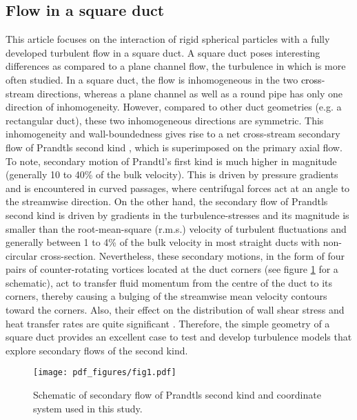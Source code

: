 \documentclass{jfm}
\def\sz#1{{\textcolor{black}{#1}}}
\begin{document}
\subsection{Flow in a square duct}\label{sec:Flow in a square duct}
This article focuses on the interaction of rigid spherical particles with a fully developed turbulent flow in a square duct. A square duct poses interesting differences as compared to a plane channel flow, the turbulence in which is more often studied. In a square duct, the flow is inhomogeneous in the two \sz{cross}-stream directions, whereas a plane channel as well as a round pipe has only one direction of inhomogeneity. However, compared to other duct geometries (e.g. a rectangular duct), these two inhomogeneous directions are symmetric. This inhomogeneity and wall-boundedness gives rise to a net cross-stream secondary flow of Prandtl\textquotesingle s second kind \citep{prandtl1926uber}, which is superimposed on the primary axial flow. To note, secondary motion of Prandtl's first kind is much higher in magnitude (generally 10 to 40\% of the bulk velocity). This is driven by pressure gradients and is encountered in curved passages, where centrifugal forces act at an angle to the streamwise direction. On the other hand, the secondary flow of Prandtl\textquotesingle s second kind is driven by gradients in the turbulence-stresses and its magnitude is smaller than the root-mean-square (r.m.s.) velocity of turbulent fluctuations and generally between 1 to 4\% of the bulk velocity in most straight ducts with non-circular cross-section. Nevertheless, these secondary motions, in the form of four pairs of counter-rotating vortices located at the duct corners (see figure \ref{fig:Schematic secondary flow} for a schematic), act to transfer fluid momentum from the centre of the duct to its corners, thereby causing a bulging of the streamwise mean velocity contours toward the corners. Also, their effect on the distribution of wall shear stress and heat transfer rates are quite significant \citep{demuren1991calculation}. Therefore, the simple geometry of a square duct provides an excellent case to test and develop turbulence models that explore secondary flows of the second kind.

\begin{figure}
\centering
 \texttt{[image: pdf\_figures/fig1.pdf]}
\caption{Schematic of secondary flow of Prandtl\textquotesingle s second kind and coordinate system used in this study.}
\label{fig:Schematic secondary flow}
\end{figure}
\end{document}
